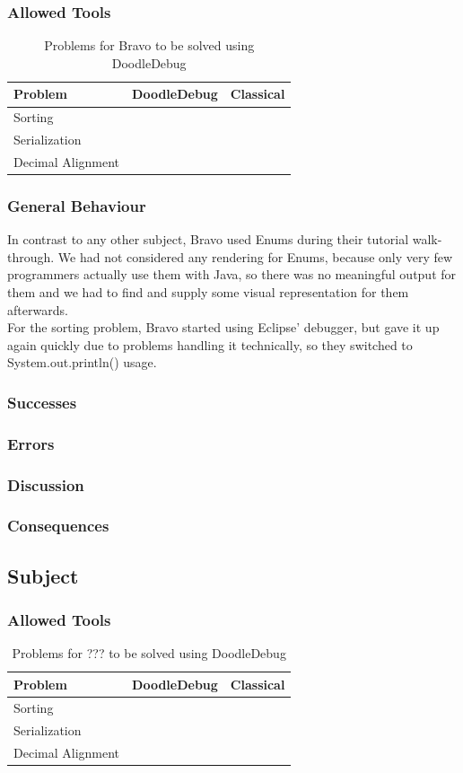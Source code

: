 \documentclass[english]{acm_proc_article-sp}
\newcommand{\tick}{\ding{51}}
\begin{document}
\subsubsection{Allowed Tools}
\begin{table}[h]
\centering
\begin{tabular}{l c c}
{\bf Problem} & {\bf DoodleDebug} & {\bf Classical} \\ \hline
Sorting &  & \tick \\
Serialization & \tick &  \\
Decimal Alignment &  & \tick \\
\end{tabular}
\caption{Problems for Bravo to be solved using DoodleDebug}
\end{table}
\subsubsection{General Behaviour}
In contrast to any other subject, Bravo used Enums during their tutorial walk-through. We had not considered any rendering for Enums, because only very few programmers actually use them with Java, so there was no meaningful output for them and we had to find and supply some visual representation for them afterwards.\\
For the sorting problem, Bravo started using Eclipse' debugger, but gave it up again quickly due to problems handling it technically, so they switched to System.out.println() usage.
\subsubsection{Successes}
\subsubsection{Errors}
\subsubsection{Discussion}
\subsubsection{Consequences}

\subsection{Subject}
\subsubsection{Allowed Tools}
\begin{table}[h]
\centering
\begin{tabular}{l c c}
{\bf Problem} & {\bf DoodleDebug} & {\bf Classical} \\ \hline
Sorting &  &  \\
Serialization &  &  \\
Decimal Alignment &  &  \\
\end{tabular}
\caption{Problems for ??? to be solved using DoodleDebug}
\end{table}
\end{document}
